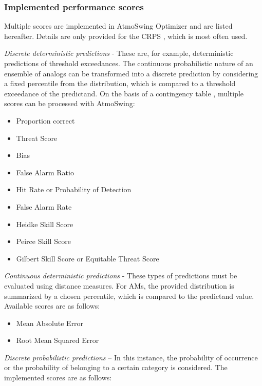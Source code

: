 \documentclass[review]{elsarticle}
\begin{document}
\subsubsection{Implemented performance scores}
\label{sec:scores}

Multiple scores are implemented in AtmoSwing Optimizer and are listed hereafter. Details are only provided for the CRPS \citep[Continuous Ranked Probability Score,][]{Brown1974, Matheson1976, Hersbach2000}, which is most often used. 


\textit{Discrete deterministic predictions} - These are, for example, deterministic predictions of threshold exceedances. The continuous probabilistic nature of an ensemble of analogs can be transformed into a discrete prediction by considering a fixed percentile from the distribution, which is compared to a threshold exceedance of the predictand. On the basis of a contingency table \citep{Wilks2006}, multiple scores can be processed with AtmoSwing:

\begin{itemize}
	\item Proportion correct \citep{Finley1884}
	\item Threat Score \citep{Gilbert1884}
	\item Bias
	\item False Alarm Ratio
	\item Hit Rate or Probability of Detection
	\item False Alarm Rate
	\item Heidke Skill Score \citep{Heidke1926}
	\item Peirce Skill Score \citep{Peirce1884}
	\item Gilbert Skill Score or Equitable Threat Score \citep{Gilbert1884}
\end{itemize}


\textit{Continuous deterministic predictions} - These types of predictions must be evaluated using distance measures. For AMs, the provided distribution is summarized by a chosen percentile, which is compared to the predictand value. Available scores are as follows:

\begin{itemize}
	\item Mean Absolute Error
	\item Root Mean Squared Error
\end{itemize}


\textit{Discrete probabilistic predictions} – In this instance, the probability of occurrence or the probability of belonging to a certain category is considered. The implemented scores are as follows:
\end{document}
